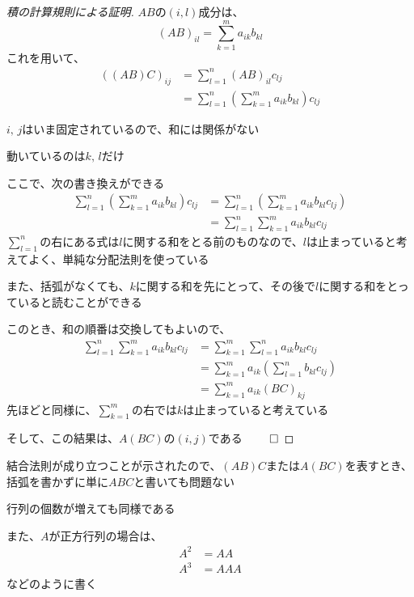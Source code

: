 \documentclass[../../../topic_linear-algebra]{subfiles}
\begin{document}
\begin{proof}[積の計算規則による証明]
  $AB$の$(i,l)$成分は、
  \begin{equation*}
    (AB)_{il} = \sum_{k=1}^m a_{ik} b_{kl}
  \end{equation*}
  これを用いて、
  \begin{align*}
    ((AB)C)_{ij} & = \sum_{l=1}^n (AB)_{il} c_{lj}                                 \\
                 & = \sum_{l=1}^n \left( \sum_{k=1}^m a_{ik} b_{kl} \right) c_{lj}
  \end{align*}

  $i,\,j$はいま固定されているので、和には関係がない

  動いているのは$k,\,l$だけ

  \br

  ここで、次の書き換えができる
  \begin{align*}
    \sum_{l=1}^n \left( \sum_{k=1}^m a_{ik} b_{kl} \right) c_{lj} & = \sum_{l=1}^n \left(\sum_{k=1}^m a_{ik} b_{kl} c_{lj} \right) \\
                                                                  & = \sum_{l=1}^n \sum_{k=1}^m a_{ik} b_{kl} c_{lj}
  \end{align*}
  $\displaystyle\sum_{l=1}^n$の右にある式は$l$に関する和をとる前のものなので、$l$は止まっていると考えてよく、単純な分配法則を使っている

  また、括弧がなくても、$k$に関する和を先にとって、その後で$l$に関する和をとっていると読むことができる

  \br

  このとき、和の順番は交換してもよいので、
  \begin{align*}
    \sum_{l=1}^n \sum_{k=1}^m a_{ik} b_{kl} c_{lj} & = \sum_{k=1}^m \sum_{l=1}^n a_{ik} b_{kl} c_{lj}                \\
                                                   & = \sum_{k=1}^m a_{ik} \left( \sum_{l=1}^n b_{kl} c_{lj} \right) \\
                                                   & = \sum_{k=1}^m a_{ik} (BC)_{kj}
  \end{align*}
  先ほどと同様に、$\displaystyle\sum_{k=1}^m$の右では$k$は止まっていると考えている

  そして、この結果は、$A(BC)$の$(i, j)$である $\qed$
\end{proof}

結合法則が成り立つことが示されたので、$(AB)C$または$A(BC)$を表すとき、括弧を書かずに単に$ABC$と書いても問題ない

行列の個数が増えても同様である

\br

また、$A$が正方行列の場合は、
\begin{align*}
  A^2 & = AA  \\
  A^3 & = AAA
\end{align*}
などのように書く
\end{document}
